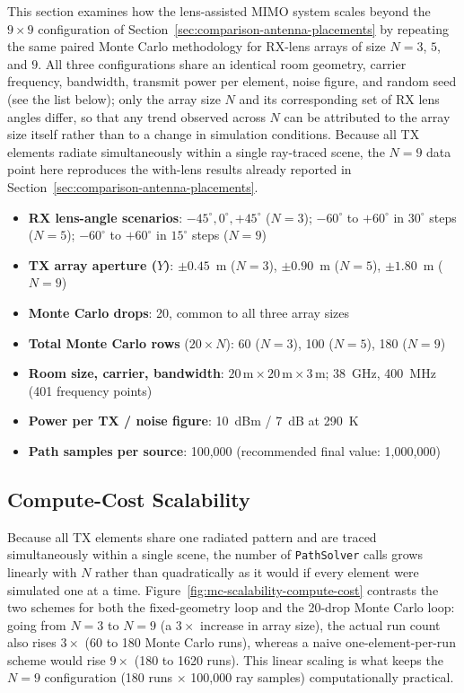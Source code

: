 This section examines how the lens-assisted MIMO system scales beyond the $9\times9$ configuration of Section~\ref{sec:comparison-antenna-placements} by repeating the same paired Monte Carlo methodology for RX-lens arrays of size $N=3$, $5$, and $9$. All three configurations share an identical room geometry, carrier frequency, bandwidth, transmit power per element, noise figure, and random seed (see the list below); only the array size $N$ and its corresponding set of RX lens angles differ, so that any trend observed across $N$ can be attributed to the array size itself rather than to a change in simulation conditions. Because all TX elements radiate simultaneously within a single ray-traced scene, the $N=9$ data point here reproduces the with-lens results already reported in Section~\ref{sec:comparison-antenna-placements}.

\begin{itemize}
    \item \textbf{RX lens-angle scenarios}: $-45^\circ,0^\circ,+45^\circ$ ($N=3$); $-60^\circ$ to $+60^\circ$ in $30^\circ$ steps ($N=5$); $-60^\circ$ to $+60^\circ$ in $15^\circ$ steps ($N=9$)
    \item \textbf{TX array aperture ($Y$)}: $\pm0.45$~m ($N=3$), $\pm0.90$~m ($N=5$), $\pm1.80$~m ($N=9$)
    \item \textbf{Monte Carlo drops}: 20, common to all three array sizes
    \item \textbf{Total Monte Carlo rows} ($20\times N$): 60 ($N=3$), 100 ($N=5$), 180 ($N=9$)
    \item \textbf{Room size, carrier, bandwidth}: $20\,\text{m}\times20\,\text{m}\times3\,\text{m}$; 38~GHz, 400~MHz (401 frequency points)
    \item \textbf{Power per TX / noise figure}: 10~dBm / 7~dB at 290~K
    \item \textbf{Path samples per source}: 100{,}000 (recommended final value: 1{,}000{,}000)
\end{itemize}

\subsection{Compute-Cost Scalability}

Because all TX elements share one radiated pattern and are traced simultaneously within a single scene, the number of \texttt{PathSolver} calls grows linearly with $N$ rather than quadratically as it would if every element were simulated one at a time. Figure~\ref{fig:mc-scalability-compute-cost} contrasts the two schemes for both the fixed-geometry loop and the 20-drop Monte Carlo loop: going from $N=3$ to $N=9$ (a $3\times$ increase in array size), the actual run count also rises $3\times$ (60 to 180 Monte Carlo runs), whereas a naive one-element-per-run scheme would rise $9\times$ (180 to 1620 runs). This linear scaling is what keeps the $N=9$ configuration (180 runs $\times$ 100,000 ray samples) computationally practical.

